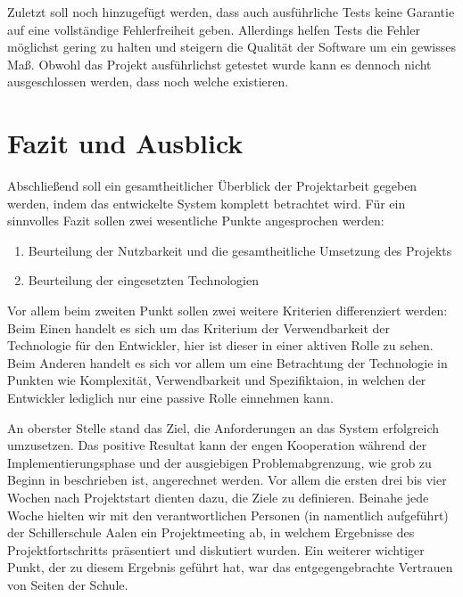 \documentclass[12pt, twoside, a4paper, ngerman]{article}
\begin{document}
Zuletzt soll noch hinzugefügt werden, dass auch ausführliche Tests keine Garantie auf eine vollständige Fehlerfreiheit geben.
Allerdings helfen Tests die Fehler möglichst gering zu halten und steigern die Qualität der Software um ein gewisses Maß.
Obwohl das Projekt ausführlichst getestet wurde kann es dennoch nicht ausgeschlossen werden, dass noch welche existieren. 

\newpage

\section{Fazit und Ausblick}\label{sec:Fazit und Ausblick}

Abschließend soll ein gesamtheitlicher Überblick der Projektarbeit gegeben werden, indem das entwickelte System komplett betrachtet wird.
Für ein sinnvolles Fazit sollen zwei wesentliche Punkte angesprochen werden:
\begin{enumerate}
  \item Beurteilung der Nutzbarkeit und die gesamtheitliche Umsetzung des Projekts
  \item Beurteilung der eingesetzten Technologien
\end{enumerate}

Vor allem beim zweiten Punkt sollen zwei weitere Kriterien differenziert werden:
Beim Einen handelt es sich um das Kriterium der Verwendbarkeit der Technologie für den Entwickler, hier ist dieser in einer aktiven Rolle zu sehen. 
Beim Anderen handelt es sich vor allem um eine Betrachtung der Technologie in Punkten wie Komplexität, Verwendbarkeit und Spezifiktaion, in welchen der Entwickler lediglich nur eine passive Rolle einnehmen kann.

An oberster Stelle stand das Ziel, die Anforderungen an das System erfolgreich umzusetzen.
Das positive Resultat kann der engen Kooperation während der Implementierungsphase und der ausgiebigen Problemabgrenzung, wie grob zu Beginn in  beschrieben ist, angerechnet werden.
Vor allem die ersten drei bis vier Wochen nach Projektstart dienten dazu, die Ziele zu definieren. Beinahe jede Woche hielten wir mit den verantwortlichen Personen (in  namentlich aufgeführt) der Schillerschule Aalen ein Projektmeeting ab, in welchem Ergebnisse des Projektfortschritts präsentiert und diskutiert wurden.
Ein weiterer wichtiger Punkt, der zu diesem Ergebnis geführt hat, war das entgegengebrachte Vertrauen von Seiten der Schule.
\end{document}
